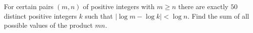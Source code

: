 For certain pairs $ (m,n)$ of positive integers with $ m\ge n$ there are exactly $ 50$ distinct positive integers $ k$ such that $ |\log m - \log k| < \log n$. Find the sum of all possible values of the product $ mn$.